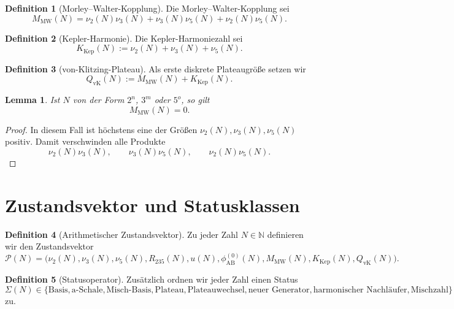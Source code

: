 \documentclass[11pt,a4paper]{article}
\theoremstyle{plain}
\newtheorem{lemma}{Lemma}
\theoremstyle{definition}
\newtheorem{definition}{Definition}
\theoremstyle{remark}
\begin{document}
\begin{definition}[Morley--Walter-Kopplung]
Die Morley--Walter-Kopplung sei
\[
M_{\mathrm{MW}}(N)
=
\nu_2(N)\nu_3(N)+\nu_3(N)\nu_5(N)+\nu_2(N)\nu_5(N).
\]
\end{definition}

\begin{definition}[Kepler-Harmonie]
Die Kepler-Harmoniezahl sei
\[
K_{\mathrm{Kep}}(N):=\nu_2(N)+\nu_3(N)+\nu_5(N).
\]
\end{definition}

\begin{definition}[von-Klitzing-Plateau]
Als erste diskrete Plateaugröße setzen wir
\[
Q_{\mathrm{vK}}(N):=M_{\mathrm{MW}}(N)+K_{\mathrm{Kep}}(N).
\]
\end{definition}

\begin{lemma}
Ist \(N\) von der Form \(2^n\), \(3^m\) oder \(5^o\), so gilt
\[
M_{\mathrm{MW}}(N)=0.
\]
\end{lemma}

\begin{proof}
In diesem Fall ist höchstens eine der Größen \(\nu_2(N),\nu_3(N),\nu_5(N)\) positiv. 
Damit verschwinden alle Produkte
\[
\nu_2(N)\nu_3(N),\qquad \nu_3(N)\nu_5(N),\qquad \nu_2(N)\nu_5(N).
\]
\end{proof}

\section{Zustandsvektor und Statusklassen}

\begin{definition}[Arithmetischer Zustandsvektor]
Zu jeder Zahl \(N\in\mathbb{N}\) definieren wir den Zustandsvektor
\[
\mathcal P(N)
=
\bigl(
\nu_2(N),\nu_3(N),\nu_5(N),
R_{235}(N),
u(N),
\phi_{\mathrm{AB}}^{(0)}(N),
M_{\mathrm{MW}}(N),
K_{\mathrm{Kep}}(N),
Q_{\mathrm{vK}}(N)
\bigr).
\]
\end{definition}

\begin{definition}[Statusoperator]
Zusätzlich ordnen wir jeder Zahl einen Status
\[
\Sigma(N)\in
\{
\text{Basis},
\text{a-Schale},
\text{Misch-Basis},
\text{Plateau},
\text{Plateauwechsel},
\text{neuer Generator},
\text{harmonischer Nachläufer},
\text{Mischzahl}
\}
\]
zu.
\end{definition}
\end{document}
